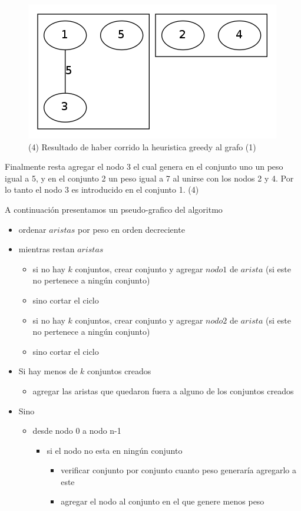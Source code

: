 \begin{figure}[H]
\begin{center}
\includegraphics[scale=0.4]{./img/greedy4.png}
\caption{(4) Resultado de haber corrido la heuristica greedy al grafo (1)}
\end{center}
\end{figure}
Finalmente resta agregar el nodo 3 el cual genera en el conjunto uno un peso igual a 5, y en el conjunto 2 un peso igual a 7 al unirse con los nodos 2 y 4. Por lo tanto el nodo 3 es introducido en el conjunto 1. (4)


A continuación presentamos un pseudo-grafico del algoritmo
\begin{itemize}
\item ordenar $aristas$ por peso en orden decreciente
\item mientras restan $aristas$ 
  \begin{itemize}
  \item si no hay $k$ conjuntos, crear conjunto y agregar $nodo1$ de $arista$ (si este no pertenece a ningún conjunto)
  \item sino cortar el ciclo  
  \item si no hay $k$ conjuntos, crear conjunto y agregar $nodo2$ de $arista$ (si este no pertenece a ningún conjunto)
  \item sino cortar el ciclo  
  \end{itemize}
\item Si hay menos de $k$ conjuntos creados
  \begin{itemize}
  \item agregar las aristas que quedaron fuera a alguno de los conjuntos creados
  \end{itemize}
\item Sino
  \begin{itemize}
  \item desde nodo 0 a nodo n-1
    \begin{itemize}
    \item si el nodo no esta en ningún conjunto
      \begin{itemize}
        \item verificar conjunto por conjunto cuanto peso generaría agregarlo a este
        \item agregar el nodo al conjunto en el que genere menos peso
      \end{itemize}
    \end{itemize}
  \end{itemize}
\end{itemize}





